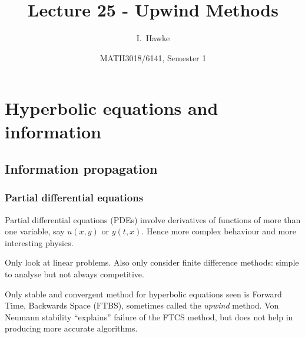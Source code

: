 \documentclass{beamer}
\title[Lecture 25] %
{Lecture 25 - Upwind Methods}
\author[I. Hawke] %
{I.~Hawke}
\institute[University of Southampton] %
{
  School of Mathematics, \\
  University of Southampton, UK
}
\date[Semester 1] %
{MATH3018/6141, Semester 1}
\begin{document}
\begin{frame}
  \titlepage
\end{frame}

\section{Hyperbolic equations and information}

\subsection{Information propagation}

\begin{frame}
  \frametitle{Partial differential equations}

  Partial differential equations (PDEs) involve derivatives of
  functions of more than one variable, say $u(x, y)$ or $y(t,
  x)$. Hence more complex behaviour and more interesting
  physics. \pause

  \vspace{1ex}

  Only look at linear problems.  Also only consider finite difference
  methods: simple to analyse but not always competitive. \pause

  \vspace{1ex}

  Only stable and convergent method for hyperbolic equations seen is
  Forward Time, Backwards Space (FTBS), sometimes called the
  \emph{upwind} method. Von Neumann stability ``explains'' failure of
  the FTCS method, but does not help in producing more accurate
  algorithms.

\end{frame}
\end{document}
